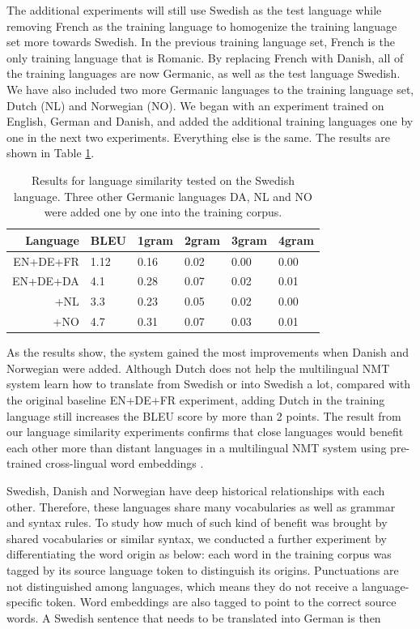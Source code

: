 \documentclass[thesis,fonts=libertine]{cluu}
\begin{document}
The additional experiments will still use Swedish as the test language while removing French as the training language to homogenize the training language set more towards Swedish. In the previous training language set, French is the only training language that is Romanic. By replacing French with Danish, all of the training languages are now Germanic, as well as the test language Swedish. We have also included two more Germanic languages to the training language set, Dutch (NL) and Norwegian (NO). We began with an experiment trained on English, German and Danish, and added the additional training languages one by one in the next two experiments. Everything else is the same. The results are shown in Table \ref{table:language_similarity}.

\begin{table}
  \centering
  \begin{tabular}{r|*{5}{l}}
    \hline
    \textbf{Language} & \textbf{BLEU} & \textbf{1gram} & \textbf{2gram} & \textbf{3gram} & \textbf{4gram} \\ [0.25ex]
    \hline\hline
    EN+DE+FR & 1.12 & 0.16 & 0.02 & 0.00 & 0.00 \\
    \hline
    EN+DE+DA & 4.1 & 0.28 & 0.07 & 0.02 & 0.01 \\
    +NL & 3.3 & 0.23 & 0.05 & 0.02 & 0.00 \\ 
    +NO & 4.7 & 0.31 & 0.07 & 0.03 & 0.01 \\
    \hline
  \end{tabular}
  \caption{Results for language similarity tested on the Swedish language. Three other Germanic languages DA, NL and NO were added one by one into the training corpus.}
  \label{table:language_similarity}
\end{table}

As the results show, the system gained the most improvements when Danish and Norwegian were added. Although Dutch does not help the multilingual NMT system learn how to translate from Swedish or into Swedish a lot, compared with the original baseline EN+DE+FR experiment, adding Dutch in the training language still increases the BLEU score by more than 2 points. The result from our language similarity experiments confirms that close languages would benefit each other more than distant languages in a multilingual NMT system using pre-trained cross-lingual word embeddings \parencite{Qi:2018aa}.

Swedish, Danish and Norwegian have deep historical relationships with each other. Therefore, these languages share many vocabularies as well as grammar and syntax rules. To study how much of such kind of benefit was brought by shared vocabularies or similar syntax, we conducted a further experiment by differentiating the word origin as below: each word in the training corpus was tagged by its source language token to distinguish its origins. Punctuations are not distinguished among languages, which means they do not receive a language-specific token. Word embeddings are also tagged to point to the correct source words. A Swedish sentence that needs to be translated into German is then
\end{document}
